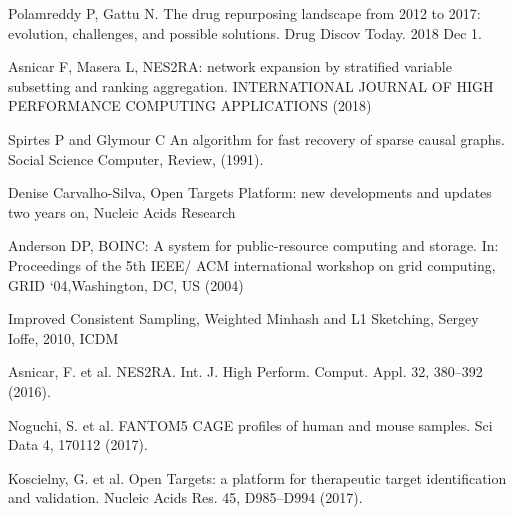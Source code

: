 \documentclass[fleqn,10pt]{SelfArx} %
\begin{document}


\begin{thebibliography}{1}
	
	 Polamreddy P, Gattu N. The drug repurposing landscape from 2012 to 2017: evolution, challenges, and possible solutions. Drug Discov Today. 2018 Dec 1.	

	 Asnicar F, Masera L, NES2RA: network expansion by stratified variable subsetting and ranking aggregation. INTERNATIONAL JOURNAL OF HIGH PERFORMANCE COMPUTING APPLICATIONS (2018)
	
	Spirtes P and Glymour C An algorithm for fast recovery
of sparse causal graphs. Social Science Computer, Review, (1991).  

	Denise Carvalho-Silva, Open Targets Platform: new developments and updates two years on, Nucleic Acids Research 

	Anderson DP, BOINC: A system for public-resource computing and storage. In: Proceedings of the 5th IEEE/ ACM international workshop on grid computing, GRID ‘04,Washington, DC, US (2004)
	
	Improved Consistent Sampling, Weighted Minhash and L1 Sketching, Sergey Ioffe, 2010, ICDM
	
	 Asnicar, F. et al. NES2RA. Int. J. High Perform. Comput. Appl. 32, 380–392 (2016).
	
	
	 Noguchi, S. et al. FANTOM5 CAGE profiles of human and mouse samples. Sci Data 4, 170112 (2017).
	
	
	 Koscielny, G. et al. Open Targets: a platform for therapeutic target identification and validation. Nucleic Acids Res. 45, D985–D994 (2017).
	
	
\end{thebibliography}

\end{document}
